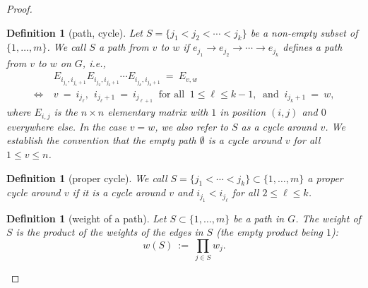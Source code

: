 \documentclass[12pt, reqno, oneside]{amsart}
\newtheorem{definition}[corollary]{Definition}
\numberwithin{equation}{section}
\begin{document}
\begin{proof}
\begin{definition}[path, cycle]\label{def:cycle-main}
Let $S = \{j_1 < j_2 < \cdots < j_k\}$ be a non-empty subset of $\{1, \dots, m\}$. We call $S$ a \textit{path} from $v$ to $w$ if $e_{j_1} \to e_{j_2} \to \cdots \to e_{j_k}$ defines a path from $v$ to $w$ on $G$, i.e.,
\begin{align}
\label{eq:matrix-multiplication}
& E_{i_{j_1},i_{j_1+1}} E_{i_{j_2},i_{j_2+1}} \cdots E_{i_{j_k},i_{j_k+1}} \ = \ E_{v,w} \\
\label{eq:path}
\iff \ & v \ = \ i_{j_\ell}, \ \ i_{j_\ell+1} \ = \ i_{j_{\ell+1}} \ \text{ for all } \ 1 \leq \ell \leq k-1, \ \text{ and } \ i_{j_k+1} \ = \ w, 
\end{align}
where $E_{i,j}$ is the $n \times n$ elementary matrix with $1$ in position $(i,j)$ and $0$ everywhere else. In the case $v = w$, we also refer to $S$ as a cycle around $v$. We establish the convention that the empty path $\emptyset$ is a cycle around $v$ for all $1 \leq v \leq n$. 
\end{definition}

\begin{definition}[proper cycle]\label{def:proper-cycle-main}
We call $S = \{j_1 < \cdots < j_k\} \subset \{1, \dots, m\}$ a proper cycle around $v$ if it is a cycle around $v$ and $i_{j_1} < i_{j_\ell}$ for all $2 \leq \ell \leq k$. 
\end{definition}

\begin{definition}[weight of a path]\label{def:path} 
Let $S \subset \{1,\dots,m\}$ be a path in $G$. The weight of $S$ is the product of the weights of the edges in $S$ (the empty product being $1$):
\begin{equation}\label{eq:weight}
w(S) \ := \ \prod_{j \in S} w_j.
\end{equation}
\end{definition}


\end{proof}
\end{document}
